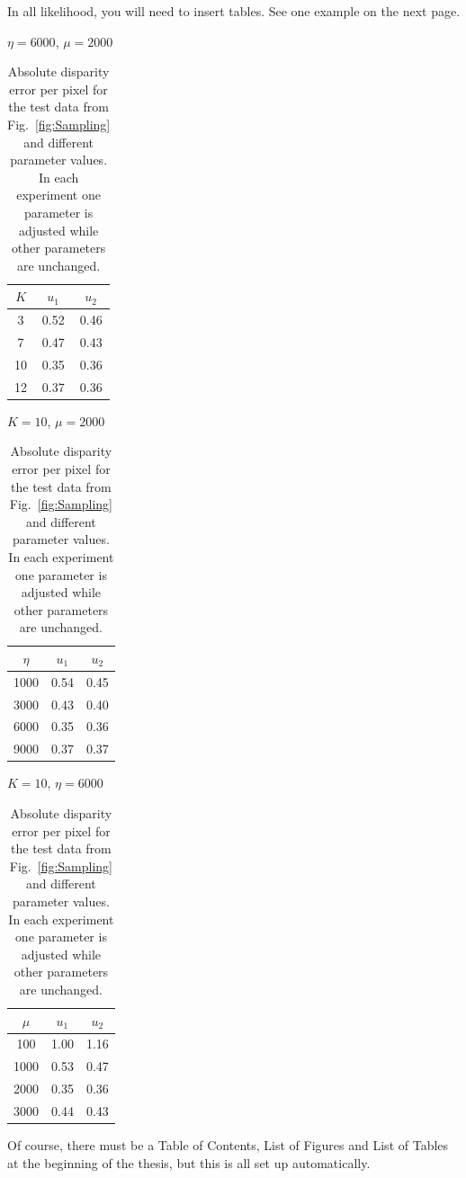 In all likelihood, you will need to insert tables. See one example on the next page.
\clearpage

\begin{table}[h]
	\caption{Absolute disparity error per pixel for the test data from
		Fig.~\ref{fig:Sampling} and different parameter values. In each experiment one
		parameter is adjusted while other parameters are unchanged.} 
	\centering
	\renewcommand{\arraystretch}{1.2}
	\begin{minipage}[b]{0.30\linewidth}
		\centerline{$\eta=6000$, $\mu=2000$}\smallskip
		\centering
		\begin{tabular}{ccc}
			\hline
			$K$ & $u_1$ & $u_2$\\
			\hline
			3   & 0.52 &0.46\\
			7   & 0.47 &0.43\\
			10  & 0.35 &0.36\\
			12  & 0.37 &0.36\\
			\hline
		\end{tabular}
	\end{minipage}
	\begin{minipage}[b]{0.34\linewidth}
		\centerline{$K=10$, $\mu=2000$}\smallskip
		\centering
		\begin{tabular}{ccc}
			\hline
			$\eta$ & $u_1$ & $u_2$\\
			\hline
			1000&0.54& 0.45\\
			3000&0.43& 0.40\\
			6000&0.35& 0.36\\
			9000&0.37& 0.37\\
			\hline
		\end{tabular}
	\end{minipage}
	\begin{minipage}[b]{0.32\linewidth}
		\centerline{$K=10$, $\eta=6000$}\smallskip
		\centering
		\begin{tabular}{ccc}
			\hline
			$\mu$ & $u_1$ & $u_2$\\
			\hline
			100 &1.00&1.16\\
			1000&0.53&0.47\\
			2000&0.35&0.36\\
			3000&0.44&0.43\\
			\hline
		\end{tabular}
	\end{minipage}
	\label{tab:Parameters}
\end{table}

Of course, there must be a Table of Contents, List of Figures and List of Tables at the beginning of the thesis, but this is all set up automatically.

